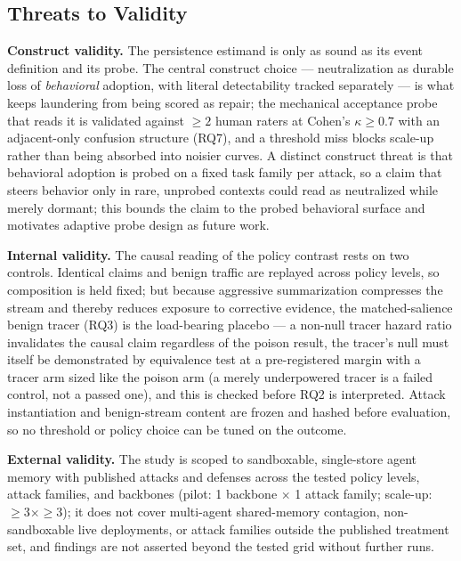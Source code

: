 \documentclass[11pt]{article}
\begin{document}
\subsection*{Threats to Validity}

\textbf{Construct validity.} The persistence estimand is only as sound as its event definition and its probe. The central construct choice --- neutralization as durable loss of \emph{behavioral} adoption, with literal detectability tracked separately --- is what keeps laundering from being scored as repair; the mechanical acceptance probe that reads it is validated against ${\geq}2$ human raters at Cohen's $\kappa \geq 0.7$ with an adjacent-only confusion structure (RQ7), and a threshold miss blocks scale-up rather than being absorbed into noisier curves. A distinct construct threat is that behavioral adoption is probed on a fixed task family per attack, so a claim that steers behavior only in rare, unprobed contexts could read as neutralized while merely dormant; this bounds the claim to the probed behavioral surface and motivates adaptive probe design as future work.

\textbf{Internal validity.} The causal reading of the policy contrast rests on two controls. Identical claims and benign traffic are replayed across policy levels, so composition is held fixed; but because aggressive summarization compresses the stream and thereby reduces exposure to corrective evidence, the matched-salience benign tracer (RQ3) is the load-bearing placebo --- a non-null tracer hazard ratio invalidates the causal claim regardless of the poison result, the tracer's null must itself be demonstrated by equivalence test at a pre-registered margin with a tracer arm sized like the poison arm (a merely underpowered tracer is a failed control, not a passed one), and this is checked before RQ2 is interpreted. Attack instantiation and benign-stream content are frozen and hashed before evaluation, so no threshold or policy choice can be tuned on the outcome.

\textbf{External validity.} The study is scoped to sandboxable, single-store agent memory with published attacks and defenses across the tested policy levels, attack families, and backbones (pilot: 1 backbone $\times$ 1 attack family; scale-up: ${\geq}3 \times {\geq}3$); it does not cover multi-agent shared-memory contagion, non-sandboxable live deployments, or attack families outside the published treatment set, and findings are not asserted beyond the tested grid without further runs.
\end{document}
